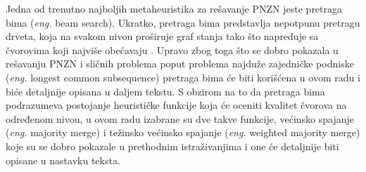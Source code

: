 \documentclass[12pt,oneside]{memoir}
\begin{document}
Jedna od trenutno najboljih metaheuristika za rešavanje PNZN jeste pretraga bima (\textit{eng.} beam search). Ukratko, pretraga
bima predstavlja nepotpunu pretragu drveta, koja na svakom nivou proširuje graf stanja tako što napreduje sa čvorovima koji najviše
obećavaju \cite{SCSBS}. Upravo zbog toga što se dobro pokazala u rešavanju PNZN i sličnih problema poput problema najduže zajedničke podniske
(\textit{eng.} longest common subsequence) pretraga bima će biti korišćena u ovom radu i biće detaljnije opisana u daljem tekstu.
S obzirom na to da pretraga bima podrazumeva postojanje heurističke funkcije koja će oceniti kvalitet čvorova na određenom nivou,
u ovom radu izabrane su dve takve funkcije, većinsko spajanje (\textit{eng.} majority merge) i težinsko većinsko spajanje
(\textit{eng.} weighted majority merge) koje su se dobro pokazale u prethodnim istraživanjima i one će detaljnije biti 
opisane u nastavku teksta.




\end{document}
